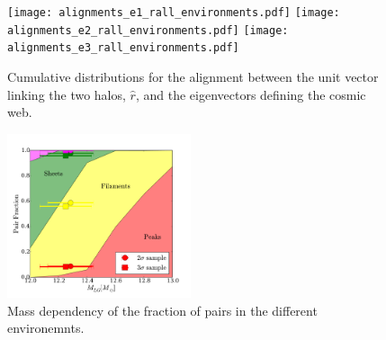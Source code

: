\documentclass{emulateapj}
\begin{document}
\begin{figure}
\begin{center}
  \texttt{[image: alignments\_e1\_rall\_environments.pdf]} 
  \texttt{[image: alignments\_e2\_rall\_environments.pdf]} 
  \texttt{[image: alignments\_e3\_rall\_environments.pdf]} 
\end{center}
\caption{Cumulative distributions for the alignment between the unit
  vector linking the two halos, $\hat{r}$, and the eigenvectors
  defining the cosmic web.
    \label{fig:alignment_r}}  
\end{figure}


\begin{figure}
\begin{center}
  \includegraphics[width=0.48\textwidth]{median_mass_fraction.pdf} 
\caption{Mass dependency of the fraction of pairs in the different
  environemnts.
\label{fig:median_fraction}}
\end{center}
\end{figure}
\end{document}
